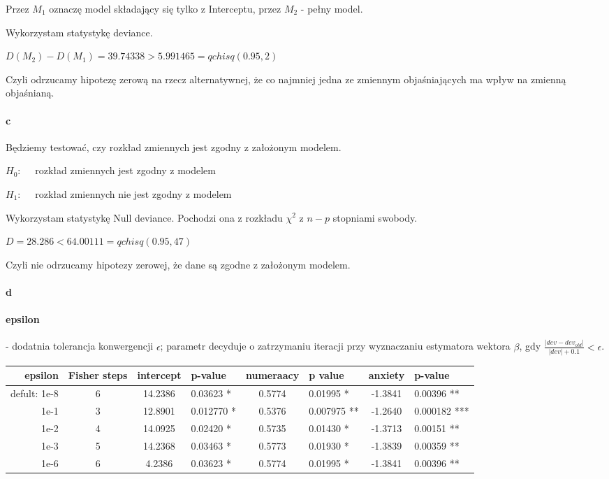 \documentclass[a4paper,11pt]{article}
\begin{document}
Przez $M_{1}$ oznaczę model składający się tylko z Interceptu, przez $M_{2}$ - pełny model.



Wykorzystam statystykę deviance.%

$D(M_{2}) - D(M_{1})  =  39.74338 >  5.991465 = qchisq(0.95, 2)$

Czyli odrzucamy hipotezę zerową na rzecz alternatywnej, że co najmniej jedna ze zmiennym objaśniających ma wpływ na zmienną objaśnianą. 


\paragraph{c}

Będziemy testować, czy rozkład zmiennych jest zgodny z  założonym modelem. 


$H_{0}: \quad $ rozkład zmiennych jest zgodny z modelem

$H_{1}: \quad $ rozkład zmiennych nie jest zgodny z modelem


Wykorzystam statystykę Null deviance. Pochodzi ona z rozkładu $\chi^{2}$ z $n-p$ stopniami swobody. 

$D = 28.286 <  64.00111 = qchisq(0.95, 47)$

Czyli nie odrzucamy hipotezy zerowej, że dane są zgodne z założonym modelem. 

\paragraph{d}
\paragraph{
epsilon	} - dodatnia tolerancja konwergencji $\epsilon$; parametr decyduje o zatrzymaniu iteracji przy wyznaczaniu estymatora wektora $\beta$, gdy $ \frac{|dev - dev_{old}|}{|dev| + 0.1} < \epsilon$.

\begin{tabular}{r|c|cl|cl|cl}
epsilon & Fisher steps & intercept & p-value & numeraacy & p value & anxiety & p-value \\ \hline
defult: 1e-8 & 6 & 14.2386 & 0.03623 * & 0.5774  &  0.01995 * & -1.3841 & 0.00396 ** \\
1e-1 & 3 & 12.8901    & 0.012770 *  & 0.5376  & 0.007975 ** & -1.2640 & 0.000182 *** \\
1e-2 & 4 & 14.0925   & 0.02420 * &  0.5735 &  0.01430 * & -1.3713 & 0.00151 ** \\
1e-3 & 5 & 14.2368  &  0.03463 * &  0.5773 &  0.01930 * & -1.3839   & 0.00359 ** \\
1e-6 & 6 & 4.2386   &  0.03623 * & 0.5774& 0.01995 * & -1.3841  &  0.00396 ** \\
\end{tabular}
\end{document}
